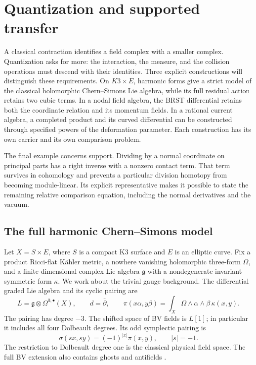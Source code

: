 \chapter{Quantization and supported transfer}
\label{cyquant:chapter}

A classical contraction identifies a field complex with a smaller complex.
Quantization asks for more: the interaction, the measure, and the collision
operations must descend with their identities.  Three explicit constructions
will distinguish these requirements.  On $K3\times E$, harmonic forms give a
strict model of the classical holomorphic Chern--Simons Lie algebra, while
its full residual action retains two cubic terms.  In a nodal field algebra,
the BRST differential retains both the coordinate relation and its momentum
fields.  In a rational current algebra, a completed product and its curved
differential can be constructed through specified powers of the deformation
parameter.  Each construction has its own carrier and its own comparison
problem.

The final example concerns support.  Dividing by a normal coordinate on
principal parts has a right inverse with a nonzero contact term.  That term
survives in cohomology and prevents a particular division homotopy from
becoming module-linear.  Its explicit representative makes it possible to
state the remaining relative comparison equation, including the normal
derivatives and the vacuum.

\section{The full harmonic Chern--Simons model}
\label{cyquant:sec:residual}

Let $X=S\times E$, where $S$ is a compact K3 surface and $E$ is an
elliptic curve.  Fix a product Ricci-flat K\"ahler metric, a nowhere vanishing
holomorphic three-form $\Omega$, and a finite-dimensional complex Lie
algebra $\mathfrak g$ with a nondegenerate invariant symmetric form
$\kappa$.  We work about the trivial gauge background.  The differential
graded Lie algebra and its cyclic pairing are
\begin{equation}\label{cyquant:eq:hcs}
 L=\mathfrak g\otimes\Omega^{0,\bullet}(X),\qquad
 d=\bar\partial,\qquad
 \pi(x\alpha,y\beta)=\int_X\Omega\wedge\alpha\wedge\beta\,
                         \kappa(x,y).
\end{equation}
The pairing has degree $-3$.  The shifted space of BV fields is $L[1]$;
in particular it includes all four Dolbeault degrees.  Its odd symplectic
pairing is
\[
 \sigma(sx,sy)=(-1)^{|x|}\pi(x,y),\qquad |s|=-1.
\]
The restriction to Dolbeault degree one is the classical physical field
space.  The full BV extension also contains ghosts and antifields
\cite[\S1.5]{cyquant:CostelloLi}.

